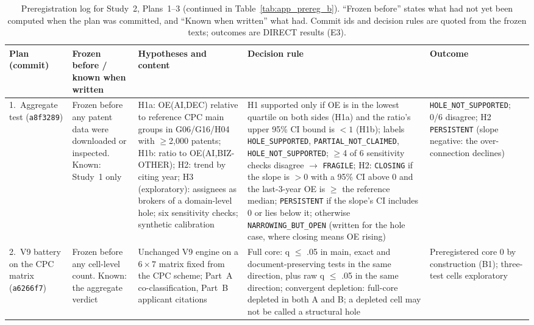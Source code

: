 \begin{table}[tbp]
\centering
\caption{Preregistration log for Study~2, Plans~1--3 (continued in Table~\ref{tab:app_prereg_b}). ``Frozen before'' states what had not yet been computed when the plan was committed, and ``Known when written'' what had. Commit ids and decision rules are quoted from the frozen texts; outcomes are DIRECT results (E3).}
\label{tab:app_prereg}
\footnotesize
\setlength{\tabcolsep}{4pt}
\begin{tabular}{p{2.0cm}p{2.5cm}p{3.7cm}p{4.3cm}p{2.3cm}}
\toprule
Plan (commit) & Frozen before / known when written & Hypotheses and content & Decision rule & Outcome \tabularnewline
\midrule
\raggedright 1.~Aggregate test (\texttt{a8f3289}) &
\raggedright Frozen before any patent data were downloaded or inspected. Known: Study~1 only &
\raggedright H1a: OE(AI,DEC) relative to reference CPC main groups in G06/G16/H04 with $\geq$2,000 patents; H1b: ratio to OE(AI,BIZ-OTHER); H2: trend by citing year; H3 (exploratory): assignees as brokers of a domain-level hole; six sensitivity checks; synthetic calibration &
\raggedright H1 supported only if OE is in the lowest quartile on both sides (H1a) and the ratio's upper 95\% CI bound is $<1$ (H1b); labels \texttt{HOLE\_\allowbreak SUPPORTED}, \texttt{PARTIAL\_\allowbreak NOT\_\allowbreak CLAIMED}, \texttt{HOLE\_\allowbreak NOT\_\allowbreak SUPPORTED}; $\geq$4 of 6 sensitivity checks disagree $\rightarrow$ \texttt{FRAGILE}; H2: \texttt{CLOSING} if the slope is $>0$ with a 95\% CI above 0 and the last-3-year OE is $\geq$ the reference median; \texttt{PERSISTENT} if the slope's CI includes 0 or lies below it; otherwise \texttt{NARROWING\_\allowbreak BUT\_\allowbreak OPEN} (written for the hole case, where closing means OE rising) &
\raggedright \texttt{HOLE\_\allowbreak NOT\_\allowbreak SUPPORTED}; 0/6 disagree; H2 \texttt{PERSISTENT} (slope negative: the over-connection declines) \tabularnewline
\addlinespace
\raggedright 2.~V9 battery on the CPC matrix (\texttt{a6266f7}) &
\raggedright Frozen before any cell-level count. Known: the aggregate verdict &
\raggedright Unchanged V9 engine on a $6\times7$ matrix fixed from the CPC scheme; Part~A co-classification, Part~B applicant citations &
\raggedright Full core: q $\leq$ .05 in main, exact and document-preserving tests in the same direction, plus raw q $\leq$ .05 in the same direction; convergent depletion: full-core depleted in both A and B; a depleted cell may not be called a structural hole &
\raggedright Preregistered core 0 by construction (B1); three-test cells exploratory \tabularnewline

\end{tabular}
\end{table}
